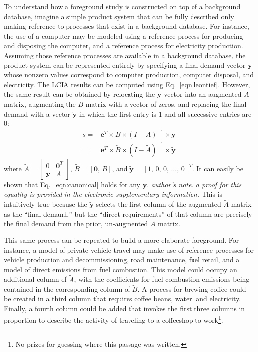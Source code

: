 To understand how a foreground study is constructed on top of a background database, imagine a simple product system that can be fully described only making reference to processes that exist in a background database.  For instance, the use of a computer may be modeled using a reference process for producing and disposing the computer, and a reference process for electricity production.  Assuming those reference processes are available in a background database, the product system can be represented entirely by specifying a final demand vector $\mathbf{y}$ whose nonzero values correspond to computer production, computer disposal, and electricity.  The LCIA results can be computed using Eq.~\ref{eqn:leontief}.  However, the same result can be obtained by relocating the $\mathbf{y}$ vector into an augmented $A$ matrix, augmenting the $B$ matrix with a vector of zeros, and replacing the final demand with a vector $\tilde{\mathbf{y}}$ in which the first entry is 1 and all successive entries are 0:
\begin{equation}
  \begin{array}{cc}
s =& \mathbf{e}^T\times B\times\left(I-A\right)^{-1}\times\mathbf{y} \\
 =& \mathbf{e}^{T}\times\tilde{B}\times\left(I-\tilde{A}\right)^{-1}\times\tilde{\mathbf{y}}
  \end{array}
  \label{eqn:canonical}
\end{equation}
where
$\tilde{A} = \left[\begin{smallmatrix} 0 & \mathbf{0}^T \\ \mathbf{y} & A  \end{smallmatrix}\right]$,
$\tilde{B} = [ \mathbf{0},\, B ]$, and $\tilde{\mathbf{y}} =  [ 1,\, 0,\, 0 ,\,\ldots,\, 0]^{T}$.
It can easily be shown that Eq.~\ref{eqn:canonical} holds for any $\mathbf{y}$.  \textit{author's note: a proof for this equality is provided in the electronic supplementary information.}  This is intuitively true because the $\tilde{\mathbf{y}}$ selects the first column of the augmented $\tilde{A}$ matrix as the ``final demand,'' but the ``direct requirements'' of that column are precisely the final demand from the prior, un-augmented $A$ matrix.  

This same process can be repeated to build a more elaborate foreground.  For instance, a model of private vehicle travel may make use of reference processes for vehicle production and decommissioning, road maintenance, fuel retail, and a model of direct emissions from fuel combustion.  This model could occupy an additional column of $\tilde{A}$, with the coefficients for fuel combustion emissions being contained in the corresponding column of $\tilde{B}$.  A process for brewing coffee could be created in a third column that requires coffee beans, water, and electricity. Finally, a fourth column could be added that invokes the first three columns in proportion to describe the activity of traveling to a coffeeshop to work\footnote{No prizes for guessing where this passage was written.}.

